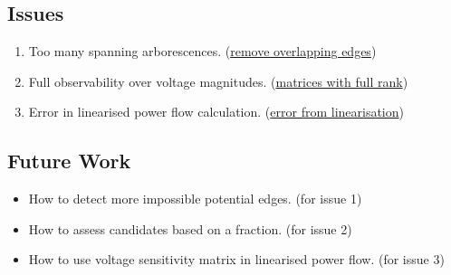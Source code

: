 \documentclass[
]{book}
\providecommand{\tightlist}{%
  \setlength{\itemsep}{0pt}\setlength{\parskip}{0pt}}
\begin{document}
\hypertarget{issues}{%
\subsection*{Issues}\label{issues}}

\begin{enumerate}
\def\labelenumi{\arabic{enumi}.}
\tightlist
\item
  Too many spanning arborescences. (\protect\hyperlink{overlapping}{remove overlapping edges})
\item
  Full observability over voltage magnitudes. (\protect\hyperlink{BRM}{matrices with full
  rank})
\item
  Error in linearised power flow calculation. (\protect\hyperlink{error}{error from
  linearisation})
\end{enumerate}

\hypertarget{future-work}{%
\subsection*{Future Work}\label{future-work}}

\begin{itemize}
\tightlist
\item
  How to detect more impossible potential edges. (for issue 1)
\item
  How to assess candidates based on a fraction. (for issue 2)
\item
  How to use voltage sensitivity matrix in linearised power flow. (for issue 3)
\end{itemize}

  
\end{document}
